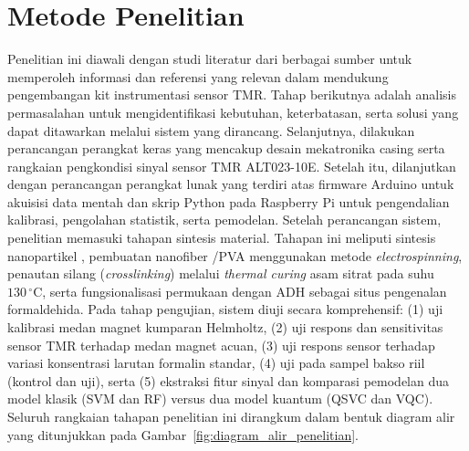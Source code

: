 \section{Metode Penelitian}
Penelitian ini diawali dengan studi literatur dari berbagai sumber untuk memperoleh informasi dan referensi yang relevan dalam mendukung pengembangan kit instrumentasi sensor TMR. Tahap berikutnya adalah analisis permasalahan untuk mengidentifikasi kebutuhan, keterbatasan, serta solusi yang dapat ditawarkan melalui sistem yang dirancang. Selanjutnya, dilakukan perancangan perangkat keras yang mencakup desain mekatronika casing serta rangkaian pengkondisi sinyal sensor TMR ALT023-10E. Setelah itu, dilanjutkan dengan perancangan perangkat lunak yang terdiri atas firmware Arduino untuk akuisisi data mentah dan skrip Python pada Raspberry Pi untuk pengendalian kalibrasi, pengolahan statistik, serta pemodelan. Setelah perancangan sistem, penelitian memasuki tahapan sintesis material. Tahapan ini meliputi sintesis nanopartikel , pembuatan nanofiber /PVA menggunakan metode \textit{electrospinning}, penautan silang (\textit{crosslinking}) melalui \textit{thermal curing} asam sitrat pada suhu $130\,^{\circ}\text{C}$, serta fungsionalisasi permukaan dengan ADH sebagai situs pengenalan formaldehida. Pada tahap pengujian, sistem diuji secara komprehensif: (1) uji kalibrasi medan magnet kumparan Helmholtz, (2) uji respons dan sensitivitas sensor TMR terhadap medan magnet acuan, (3) uji respons sensor terhadap variasi konsentrasi larutan formalin standar, (4) uji pada sampel bakso riil (kontrol dan uji), serta (5) ekstraksi fitur sinyal dan komparasi pemodelan dua model klasik (SVM dan RF) versus dua model kuantum (QSVC dan VQC). Seluruh rangkaian tahapan penelitian ini dirangkum dalam bentuk diagram alir yang ditunjukkan pada Gambar~\ref{fig:diagram_alir_penelitian}.

